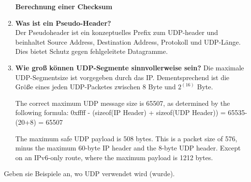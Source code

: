 \documentclass[11pt]{article}
\begin{document}
\begin{enumerate}[label=\textbf{\alph*}.)]
        \textbf{Berechnung einer Checksum}

        \item \textbf{Was ist ein Pseudo-Header?}\\
        Der Pseudoheader ist ein konzeptuelles Prefix zum UDP-header und beinhaltet Source Address,
        Destination Address, Protokoll und UDP-Länge. Dies bietet Schutz gegen fehlgeleitete Datagramme.


        \item \textbf{Wie groß können UDP-Segmente sinnvollerweise sein?}
        Die maximale UDP-Segmentsize ist vorgegeben durch das IP. Dementsprechend ist die Größe eines
        jeden UDP-Packetes zwischen 8 Byte und $2^(16)$ Byte.

        The correct maximum UDP message size is 65507, as determined by the following formula:
        0xffff - (sizeof(IP Header) + sizeof(UDP Header)) = 65535-(20+8) = 65507

        The maximum safe UDP payload is 508 bytes.
        This is a packet size of 576, minus the maximum 60-byte IP header and the 8-byte UDP header.
        Except on an IPv6-only route, where the maximum payload is 1212 bytes.

    \end{enumerate}

    Geben sie Beispiele an, wo UDP verwendet wird (wurde).
\end{document}
